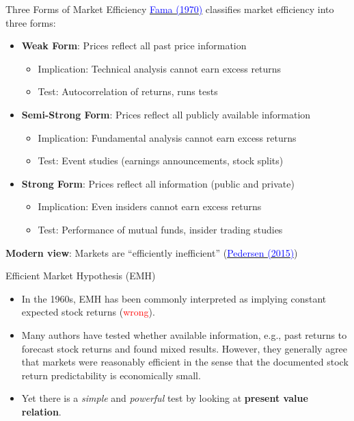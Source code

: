 \documentclass{beamer}
\begin{document}
\begin{frame}{Three Forms of Market Efficiency}
	\href{https://doi.org/10.2307/2325486}{\textcolor{blue}{Fama (1970)}} classifies market efficiency into three forms:
	\begin{itemize}
		\item \textbf{Weak Form}: Prices reflect all past price information
		\begin{itemize}
			\item Implication: Technical analysis cannot earn excess returns
			\item Test: Autocorrelation of returns, runs tests
		\end{itemize}
		\item \textbf{Semi-Strong Form}: Prices reflect all publicly available information
		\begin{itemize}
			\item Implication: Fundamental analysis cannot earn excess returns
			\item Test: Event studies (earnings announcements, stock splits)
		\end{itemize}
		\item \textbf{Strong Form}: Prices reflect all information (public and private)
		\begin{itemize}
			\item Implication: Even insiders cannot earn excess returns
			\item Test: Performance of mutual funds, insider trading studies
		\end{itemize}
	\end{itemize}
	
	\vspace{5pt}
	\textbf{Modern view}: Markets are ``efficiently inefficient'' (\href{https://press.princeton.edu/books/hardcover/9780691166193/efficiently-inefficient}{\textcolor{blue}{Pedersen (2015)}})
\end{frame}


\begin{frame}{Efficient Market Hypothesis (EMH)}
	\begin{itemize}
		\item In the 1960s, EMH has been commonly interpreted as implying constant
		expected stock returns (\textcolor{red}{wrong}).
		\item Many authors have tested whether available information, e.g., past returns to forecast stock returns and found mixed results. However, they generally agree that markets were reasonably efficient in the sense that the documented stock return predictability is economically small.
		\item Yet there is a \textit{simple} and \textit{powerful} test by looking at \textbf{present value relation}.
	\end{itemize}
\end{frame}
\end{document}
